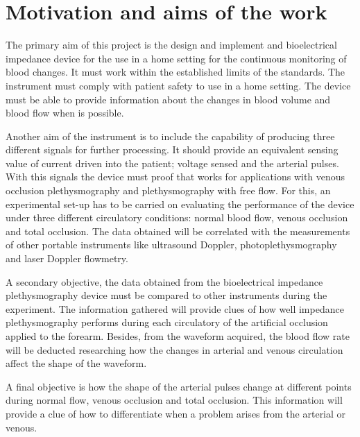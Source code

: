 \section{Motivation and aims of the work}
The primary aim of this project is the design and implement and bioelectrical impedance device for the use in a home setting for the continuous monitoring of blood changes. It must work within the established limits of the standards. The instrument must comply with patient safety to use in a home setting. The device must be able to provide information about the changes in blood volume and blood flow when is possible. 

Another aim of the instrument is to include the capability of producing three different signals for further processing. It should provide an equivalent sensing value of current driven into the patient; voltage sensed and the arterial pulses. With this signals the device must proof that works for applications with venous occlusion plethysmography and plethysmography with free flow. For this, an experimental set-up has to be carried on evaluating the performance of the device under three different circulatory conditions: normal blood flow, venous occlusion and total occlusion. The data obtained will be correlated with the measurements of other portable instruments like ultrasound Doppler, photoplethysmography and laser Doppler flowmetry.

A secondary objective, the data obtained from the bioelectrical impedance plethysmography device must be compared to other instruments during the experiment. The information gathered will provide clues of how well impedance plethysmography performs during each circulatory of the artificial occlusion applied to the forearm. Besides, from the waveform acquired, the blood flow rate will be deducted researching how the changes in arterial and venous circulation affect the shape of the waveform.

A final objective is how the shape of the arterial pulses change at different points during normal flow, venous occlusion and total occlusion. This information will provide a clue of how to differentiate when a problem arises from the arterial or venous.


